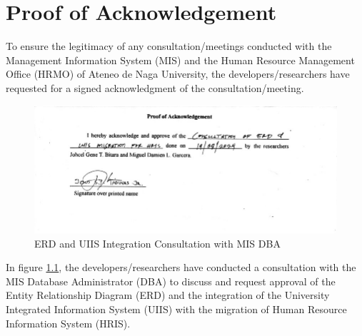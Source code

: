 \chapter{Proof of Acknowledgement}

\label{proof-acknowledgement}

To ensure the legitimacy of any consultation/meetings conducted with the Management Information System (MIS) and the Human Resource Management Office (HRMO) of Ateneo de Naga University, the developers/researchers have requested for a signed acknowledgment of the consultation/meeting. 

\begin{figure}[H]
    \centering
    \includegraphics[width=1\textwidth]{figures/images/poa/erd-consultation.JPG}
    \caption{ERD and UIIS Integration Consultation with MIS DBA}
    \label{fig:proof-ack-erd-consultation}
\end{figure}

In figure \ref{fig:proof-ack-erd-consultation}, the developers/researchers have conducted a consultation with the MIS Database Administrator (DBA) to discuss and request approval of the Entity Relationship Diagram (ERD) and the integration of the University Integrated Information System (UIIS) with the migration of Human Resource Information System (HRIS).